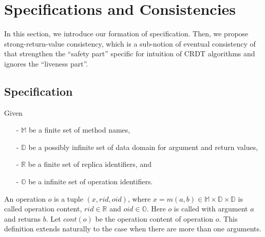 
\section{Specifications and Consistencies}
\label{sec:specifications and consistencies}

In this section, we introduce our formation of specification. Then, we propose strong-return-value consistency, which is a sub-notion of eventual consistency of \cite{Bouajjani:2014} that strengthen the ``safety part'' specific for intuition of CRDT algorithms and ignores the ``liveness part''. 


\subsection{Specification}
\label{subsec:specification}

Given

\begin{itemize}
\setlength{\itemsep}{0.5pt}
\item[-] $\mathbb{M}$ be a finite set of method names,

\item[-] $\mathbb{D}$ be a possibly infinite set of data domain for argument and return values,

\item[-] $\mathbb{R}$ be a finite set of replica identifiers, and

\item[-] $\mathbb{O}$ be a infinite set of operation identifiers.
\end{itemize}

An operation $o$ is a tuple $(x,rid,oid)$, where $x =  m(a,b) \in \mathbb{M} \times \mathbb{D} \times \mathbb{D}$ is called operation content, $rid \in \mathbb{R}$ and $oid \in \mathbb{O}$. Here $o$ is called with argument $a$ and returns $b$. Let $cont(o)$ be the operation content of operation $o$. This definition extends naturally to the case when there are more than one arguments.

